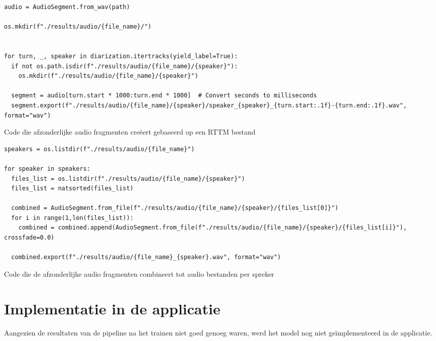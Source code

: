 \begin{listing}
	\begin{verbatim}
audio = AudioSegment.from_wav(path)

os.mkdir(f"./results/audio/{file_name}/")


for turn, _, speaker in diarization.itertracks(yield_label=True):
  if not os.path.isdir(f"./results/audio/{file_name}/{speaker}"):
    os.mkdir(f"./results/audio/{file_name}/{speaker}")

  segment = audio[turn.start * 1000:turn.end * 1000]  # Convert seconds to milliseconds
  segment.export(f"./results/audio/{file_name}/{speaker}/speaker_{speaker}_{turn.start:.1f}-{turn.end:.1f}.wav", format="wav")
	\end{verbatim}
	\caption[Code om korte audio bestanden te creëren]{\label{code:korte-bestanden}Code die afzonderlijke audio fragmenten creëert gebaseerd op een RTTM bestand}
\end{listing}

\begin{listing}
	\begin{verbatim}
speakers = os.listdir(f"./results/audio/{file_name}")

for speaker in speakers:
  files_list = os.listdir(f"./results/audio/{file_name}/{speaker}")
  files_list = natsorted(files_list)

  combined = AudioSegment.from_file(f"./results/audio/{file_name}/{speaker}/{files_list[0]}")
  for i in range(1,len(files_list)):
    combined = combined.append(AudioSegment.from_file(f"./results/audio/{file_name}/{speaker}/{files_list[i]}"), crossfade=0.0)

  combined.export(f"./results/audio/{file_name}_{speaker}.wav", format="wav")
	\end{verbatim}
	\caption[Code om audio bestanden per spreker te creëren]{\label{code:audio-per-spreker}Code die de afzonderlijke audio fragmenten combineert tot audio bestanden per spreker}
\end{listing}

\section{Implementatie in de applicatie}
\label{sec:implementatie}
Aangezien de resultaten van de pipeline na het trainen niet goed genoeg waren, werd het model nog niet geïmplementeerd in de applicatie.
